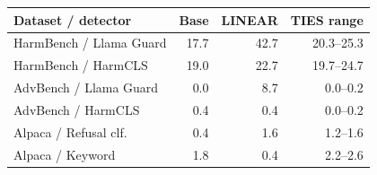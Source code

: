 \begin{tabular}{lrrr}
\toprule
Dataset / detector & Base & LINEAR & TIES range \\
\midrule
HarmBench / Llama Guard & 17.7 & 42.7 & 20.3--25.3 \\
HarmBench / HarmCLS & 19.0 & 22.7 & 19.7--24.7 \\
AdvBench / Llama Guard & 0.0 & 8.7 & 0.0--0.2 \\
AdvBench / HarmCLS & 0.4 & 0.4 & 0.0--0.2 \\
Alpaca / Refusal clf. & 0.4 & 1.6 & 1.2--1.6 \\
Alpaca / Keyword & 1.8 & 0.4 & 2.2--2.6 \\
\bottomrule
\end{tabular}
